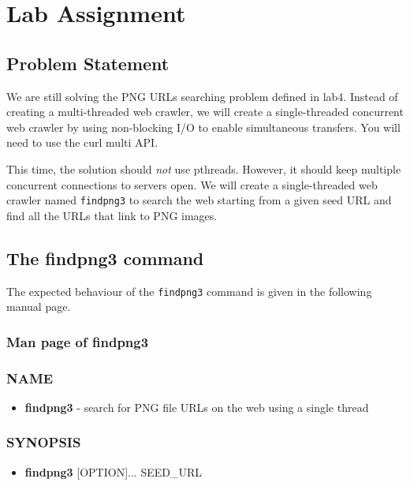 \section{Lab Assignment}
\subsection{Problem Statement}
We are still solving the PNG URLs searching problem defined in lab4. Instead of creating a multi-threaded web crawler, we will create a single-threaded concurrent web crawler by using non-blocking I/O to enable simultaneous transfers. You will need to use the curl multi API.

This time, the solution should {\em not} use pthreads. However, it should keep multiple concurrent connections to servers open. We will create a single-threaded web crawler named \verb+findpng3+ to search the web starting from a given seed URL and find all the URLs that link to PNG images.

\subsection{The findpng3 command}
The expected behaviour of the \verb+findpng3+ command is given in the following manual page.
\subsubsection{Man page of findpng3}
\label{sec:findpng3_manpage}
\subsubsection*{NAME}
\begin{itemize}
	\item[]{\bf findpng3} - search for PNG file URLs on the web using a single thread
\end{itemize}
\subsubsection*{SYNOPSIS}
\begin{itemize}
	\item[]{\bf findpng3} [OPTION]... SEED\_URL
\end{itemize}
